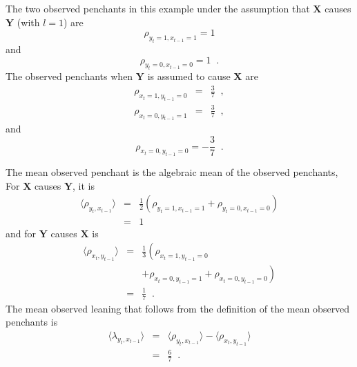 The two observed penchants in this example under the assumption that $\mathbf{X}$ causes $\mathbf{Y}$ (with $l=1$) are
\begin{equation}
\label{eqn:rhoex1}
\rho_{y_t=1,x_{t-1}=1}=1
\end{equation}
and
\begin{equation*}
\rho_{y_t=0,x_{t-1}=0}=1\;\;.
\end{equation*}
The observed penchants when $\mathbf{Y}$ is assumed to cause $\mathbf{X}$ are
\begin{eqnarray*}
\rho_{x_t=1,y_{t-1}=0} &=& \frac{3}{7}\;\;,\\
\rho_{x_t=0,y_{t-1}=1} &=& \frac{3}{7}\;\;,
\end{eqnarray*}
and
\begin{equation*}
\rho_{x_t=0,y_{t-1}=0}=-\frac{3}{7}\;\;.
\end{equation*}

The mean observed penchant is the algebraic mean of the observed penchants,  For $\mathbf{X}$ causes $\mathbf{Y}$, it is
\begin{eqnarray*}
\langle \rho_{y_t,x_{t-1}} \rangle &=& \frac{1}{2}\left(\rho_{y_t=1,x_{t-1}=1} + \rho_{y_t=0,x_{t-1}=0}\right)\\
&=& 1
\end{eqnarray*}
and for $\mathbf{Y}$ causes $\mathbf{X}$ is
\begin{eqnarray*}
\langle \rho_{x_t,y_{t-1}} \rangle &=& \frac{1}{3}\left(\rho_{x_t=1,y_{t-1}=0} \right.\\
& &\left. +\rho_{x_t=0,y_{t-1}=1} + \rho_{x_t=0,y_{t-1}=0}\right)\\
&=& \frac{1}{7}\;\;.
\end{eqnarray*}
The mean observed leaning that follows from the definition of the mean observed penchants is
\begin{eqnarray}
\label{eqn:meanlean}
\langle \lambda_{y_t,x_{t-1}} \rangle &=& \langle \rho_{y_t,x_{t-1}} \rangle - \langle \rho_{x_t,y_{t-1}} \rangle\\
&=& \frac{6}{7}\;\;.
\end{eqnarray}

